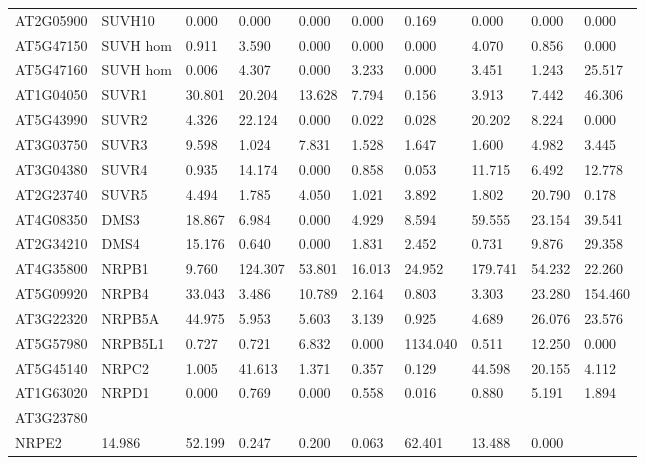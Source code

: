 \begin{landscape}
\begin{longtable}{l|l|lll|ll|lll}
AT2G05900 & SUVH10   & 0.000  & 0.000   & 0.000    & 0.000  & 0.169    & 0.000   & 0.000  & 0.000    \\
AT5G47150 & SUVH hom & 0.911  & 3.590   & 0.000    & 0.000  & 0.000    & 4.070   & 0.856  & 0.000    \\
AT5G47160 & SUVH hom & 0.006  & 4.307   & 0.000    & 3.233  & 0.000    & 3.451   & 1.243  & 25.517   \\ \hline
AT1G04050 & SUVR1    & 30.801 & 20.204  & 13.628   & 7.794  & 0.156    & 3.913   & 7.442  & 46.306   \\
AT5G43990 & SUVR2    & 4.326  & 22.124  & 0.000    & 0.022  & 0.028    & 20.202  & 8.224  & 0.000    \\
AT3G03750 & SUVR3    & 9.598  & 1.024   & 7.831    & 1.528  & 1.647    & 1.600   & 4.982  & 3.445    \\
AT3G04380 & SUVR4    & 0.935  & 14.174  & 0.000    & 0.858  & 0.053    & 11.715  & 6.492  & 12.778   \\
AT2G23740 & SUVR5    & 4.494  & 1.785   & 4.050    & 1.021  & 3.892    & 1.802   & 20.790 & 0.178    \\ \hline
AT4G08350 & DMS3     & 18.867 & 6.984   & 0.000    & 4.929  & 8.594    & 59.555  & 23.154 & 39.541   \\
AT2G34210 & DMS4     & 15.176 & 0.640   & 0.000    & 1.831  & 2.452    & 0.731   & 9.876  & 29.358   \\ \hline
AT4G35800 & NRPB1    & 9.760  & 124.307 & 53.801   & 16.013 & 24.952   & 179.741 & 54.232 & 22.260   \\
AT5G09920 & NRPB4    & 33.043 & 3.486   & 10.789   & 2.164  & 0.803    & 3.303   & 23.280 & 154.460  \\
AT3G22320 & NRPB5A   & 44.975 & 5.953   & 5.603    & 3.139  & 0.925    & 4.689   & 26.076 & 23.576   \\
AT5G57980 & NRPB5L1  & 0.727  & 0.721   & 6.832    & 0.000  & 1134.040 & 0.511   & 12.250 & 0.000    \\
AT5G45140 & NRPC2    & 1.005  & 41.613  & 1.371    & 0.357  & 0.129    & 44.598  & 20.155 & 4.112    \\
AT1G63020 & NRPD1    & 0.000  & 0.769   & 0.000    & 0.558  & 0.016    & 0.880   & 5.191  & 1.894    \\
AT3G23780 &
  \begin{tabular}[c]{@{}l@{}}NRPD2/\\ NRPE2\end{tabular} &
  14.986 &
  52.199 &
  0.247 &
  0.200 &
  0.063 &
  62.401 &
  13.488 &
  0.000 \\

\end{longtable}
\end{landscape}
